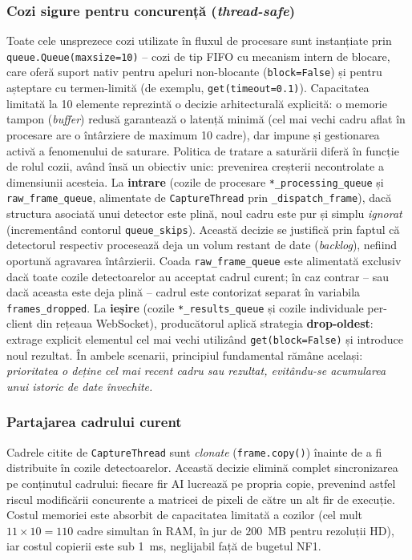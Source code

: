 \documentclass[../../main.tex]{subfiles}
\begin{document}
\subsubsection{Cozi sigure pentru concurență (\textit{thread-safe})}

Toate cele unsprezece cozi utilizate în fluxul de procesare sunt instanțiate prin \texttt{queue.Queue(maxsize=10)} -- cozi de tip FIFO cu mecanism intern de blocare, care oferă suport nativ pentru apeluri non-blocante (\texttt{block=False}) și pentru așteptare cu termen-limită (de exemplu, \texttt{get(timeout=0.1)}). Capacitatea limitată la 10 elemente reprezintă o decizie arhitecturală explicită: o memorie tampon (\textit{buffer}) redusă garantează o latență minimă (cel mai vechi cadru aflat în procesare are o întârziere de maximum 10 cadre), dar impune și gestionarea activă a fenomenului de saturare. Politica de tratare a saturării diferă în funcție de rolul cozii, având însă un obiectiv unic: prevenirea creșterii necontrolate a dimensiunii acesteia. La \textbf{intrare} (cozile de procesare \texttt{*\_processing\_queue} și \texttt{raw\_frame\_queue}, alimentate de \texttt{CaptureThread} prin \texttt{\_dispatch\_frame}), dacă structura asociată unui detector este plină, noul cadru este pur și simplu \emph{ignorat} (incrementând contorul \texttt{queue\_skips}). Această decizie se justifică prin faptul că detectorul respectiv procesează deja un volum restant de date (\textit{backlog}), nefiind oportună agravarea întârzierii. Coada \texttt{raw\_frame\_queue} este alimentată exclusiv dacă toate cozile detectoarelor au acceptat cadrul curent; în caz contrar -- sau dacă aceasta este deja plină -- cadrul este contorizat separat în variabila \texttt{frames\_dropped}. La \textbf{ieșire} (cozile \texttt{*\_results\_queue} și cozile individuale per-client din rețeaua WebSocket), producătorul aplică strategia \textbf{drop-oldest}: extrage explicit elementul cel mai vechi utilizând \texttt{get(block=False)} și introduce noul rezultat. În ambele scenarii, principiul fundamental rămâne același: \emph{prioritatea o deține cel mai recent cadru sau rezultat, evitându-se acumularea unui istoric de date învechite.}

\subsubsection{Partajarea cadrului curent}

Cadrele citite de \texttt{CaptureThread} sunt \emph{clonate} (\texttt{frame.copy()}) înainte de a fi distribuite în cozile detectoarelor. Această decizie elimină complet sincronizarea pe conținutul cadrului: fiecare fir AI lucrează pe propria copie, prevenind astfel riscul modificării concurente a matricei de pixeli de către un alt fir de execuție. Costul memoriei este absorbit de capacitatea limitată a cozilor (cel mult $11 \times 10 = 110$ cadre simultan în RAM, în jur de $200$~MB pentru rezoluții HD), iar costul copierii este sub 1~ms, neglijabil față de bugetul NF1.
\end{document}
